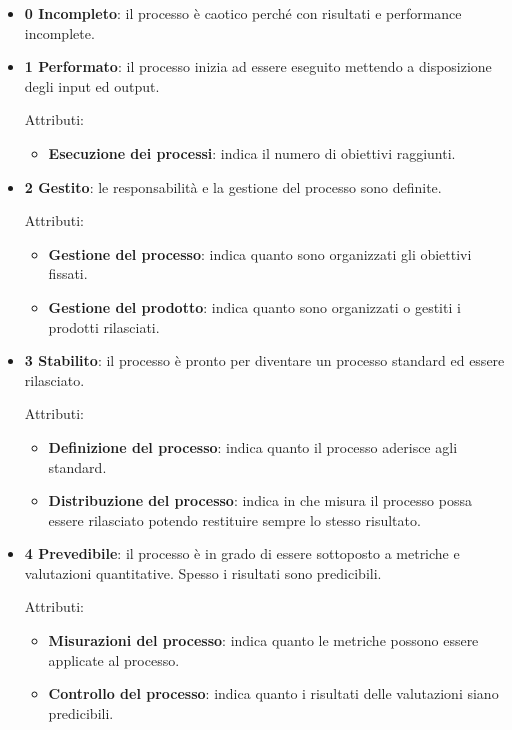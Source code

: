	\begin{itemize}
		\item \textbf{0 Incompleto}: il processo è caotico perché con risultati e performance incomplete.
	
		\item \textbf{1 Performato}: il processo inizia ad essere eseguito mettendo a disposizione degli input ed output.
		
		Attributi:
		
		\begin{itemize}
			\item \textbf{Esecuzione dei processi}: indica il numero di obiettivi raggiunti.
		\end{itemize}
	
		\item \textbf{2 Gestito}: le responsabilità e la gestione del processo sono definite.
		
		Attributi:
		
		\begin{itemize}
			\item \textbf{Gestione del processo}: indica quanto sono organizzati gli obiettivi fissati.
			\item \textbf{Gestione del prodotto}: indica quanto sono organizzati o gestiti i prodotti rilasciati.
		\end{itemize}
	
		\item \textbf{3 Stabilito}: il processo è pronto per diventare un processo standard ed essere rilasciato.
		
		Attributi:
		
		\begin{itemize}
			\item \textbf{Definizione del processo}: indica quanto il processo aderisce agli standard.
			\item \textbf{Distribuzione del processo}: indica in che misura il processo possa essere rilasciato potendo restituire sempre lo stesso risultato.
		\end{itemize}
	
		\item \textbf{4 Prevedibile}: il processo è in grado di essere sottoposto a metriche e valutazioni quantitative. Spesso i risultati sono predicibili.
		
		Attributi:
		
		\begin{itemize}
			\item \textbf{Misurazioni del processo}: indica quanto le metriche possono essere applicate al processo.
			\item \textbf{Controllo del processo}: indica quanto i risultati delle valutazioni siano predicibili.
		\end{itemize}
	

\end{itemize}
